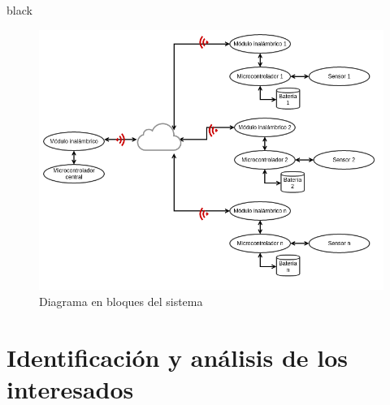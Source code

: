 \documentclass[11pt]{charter}
\begin{document}
\begin{consigna}{black}
\vspace{25px}

\begin{figure}[htpb]
\centering 
\includegraphics[width=.9\textwidth]{./Figuras/Figura1.png}
\caption{Diagrama en bloques del sistema}
\label{fig:diagBloques}
\end{figure}

\vspace{25px}

\end{consigna}




\section{Identificación y análisis de los interesados}
\label{sec:interesados}
\end{document}
